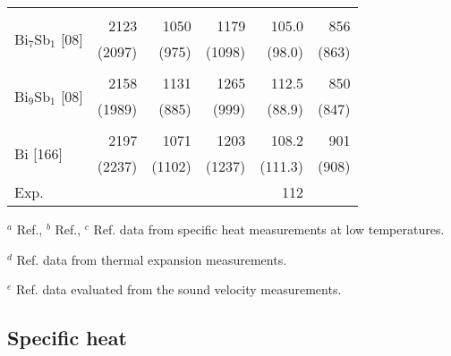 \documentclass[twocolumn,superscriptaddress,nofootinbib,floatfix,aps,showpacs,prb,citeautoscript,reprint]{revtex4-1}
\begin{document}
\begin{table}[hbt!]
\begin{adjustbox}{width=0.48\textwidth}
\begin{threeparttable}
\begin{tabular}{lrrrrr}
\hline\\
\multirow{2}{*}{Bi$_{7}$Sb$_{1}$ [08]}   & 2123 & 1050 & 1179 & 105.0 & 856 \\
							&    (2097) & (975) & (1098) & (98.0) & (863) \\ 

\hline\\
\multirow{2}{*}{Bi$_{9}$Sb$_{1}$ [08]}   & 2158 & 1131 & 1265 & 112.5 & 850 \\
							&    (1989) & (885) & (999) & (88.9) & (847) \\ 

\hline\\
\multirow{2}{*}{Bi [166]}   & 2197 & 1071 & 1203 & 108.2 & 901 \\
				 &    (2237) & (1102) & (1237) & (111.3) & (908) \\
 \hspace{1cm} Exp.\tnote{$e$}	&  &  & &  112 & \\ 

\hline
\end{tabular}
    \begin{tablenotes}
         \item $^{a}$ Ref.\cite{Blewer1968}, $^{b}$ Ref.\cite{McCollum1967}, $^{c}$ Ref.\cite{Culbert1967} data from specific heat measurements at low temperatures.
         \item $^d$ Ref.\cite{White1972}  data from thermal expansion measurements. 
         \item $^e$ Ref.\cite{Fischer1978} data evaluated from the sound velocity measurements.  
     \end{tablenotes}

\end{threeparttable}
\end{adjustbox}

\end{table} 



\subsection{Specific heat}
\end{document}

